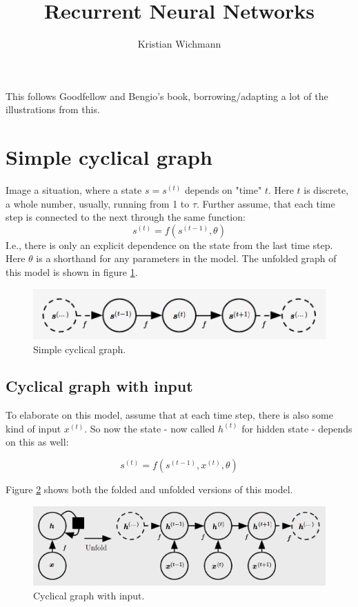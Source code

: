 \documentclass[12pt, a4paper]{article}
\title{Recurrent Neural Networks}
\author{Kristian Wichmann}
\numberwithin{equation}{section}
\begin{document}
\maketitle

This follows Goodfellow and Bengio's book, borrowing/adapting a lot of the illustrations from this.

\section{Simple cyclical graph}

Image a situation, where a state $s=s^{(t)}$ depends on "time" $t$. Here $t$ is discrete, a whole number, usually, running from 1 to $\tau$. Further assume, that each time step is connected to the next through the same function:
\begin{equation}
s^{(t)}=f(s^{(t-1)},\theta)
\end{equation}
I.e., there is only an explicit dependence on the state from the last time step. Here $\theta$ is a shorthand for any parameters in the model. The unfolded graph of this model is shown in figure \ref{fig:cyclical_graph}.

\begin{figure}
\centering
\includegraphics[width=\textwidth]{cyclical_graph}
\caption{Simple cyclical graph.}
\label{fig:cyclical_graph}
\end{figure}

\subsection{Cyclical graph with input}
To elaborate on this model, assume that at each time step, there is also some kind of input $x^{(t)}$. So now the state - now called $h^{(t)}$ for hidden state - depends on this as well:

\begin{equation}
s^{(t)}=f(s^{(t-1)}, x^{(t)},\theta)
\end{equation}

Figure \ref{fig:cyclical_with_input} shows both the folded and unfolded versions of this model.

\begin{figure}
\centering
\includegraphics[width=\textwidth]{cyclical_with_input}
\caption{Cyclical graph with input.}
\label{fig:cyclical_with_input}
\end{figure}
\end{document}
